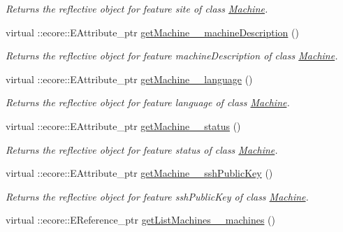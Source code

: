 \begin{DoxyCompactItemize}
\begin{DoxyCompactList}\small\item\em Returns the reflective object for feature site of class \hyperlink{classUMS__Data_1_1Machine}{Machine}. \item\end{DoxyCompactList}\item 
virtual ::ecore::EAttribute\_\-ptr \hyperlink{classUMS__Data_1_1UMS__DataPackage_a7b26acb09f019a395ad5edc414a932ba}{getMachine\_\-\_\-machineDescription} ()
\begin{DoxyCompactList}\small\item\em Returns the reflective object for feature machineDescription of class \hyperlink{classUMS__Data_1_1Machine}{Machine}. \item\end{DoxyCompactList}\item 
virtual ::ecore::EAttribute\_\-ptr \hyperlink{classUMS__Data_1_1UMS__DataPackage_a3961c280d91be4aaf7999fd16e325a1d}{getMachine\_\-\_\-language} ()
\begin{DoxyCompactList}\small\item\em Returns the reflective object for feature language of class \hyperlink{classUMS__Data_1_1Machine}{Machine}. \item\end{DoxyCompactList}\item 
virtual ::ecore::EAttribute\_\-ptr \hyperlink{classUMS__Data_1_1UMS__DataPackage_a25eeebf002ccabbdefeb3883e220e0ef}{getMachine\_\-\_\-status} ()
\begin{DoxyCompactList}\small\item\em Returns the reflective object for feature status of class \hyperlink{classUMS__Data_1_1Machine}{Machine}. \item\end{DoxyCompactList}\item 
virtual ::ecore::EAttribute\_\-ptr \hyperlink{classUMS__Data_1_1UMS__DataPackage_a85345ec79dac3a93c2b0bace1b08ff30}{getMachine\_\-\_\-sshPublicKey} ()
\begin{DoxyCompactList}\small\item\em Returns the reflective object for feature sshPublicKey of class \hyperlink{classUMS__Data_1_1Machine}{Machine}. \item\end{DoxyCompactList}\item 
virtual ::ecore::EReference\_\-ptr \hyperlink{classUMS__Data_1_1UMS__DataPackage_a0df10abe43a11984da4d704fa7078c14}{getListMachines\_\-\_\-machines} ()

\end{DoxyCompactItemize}
